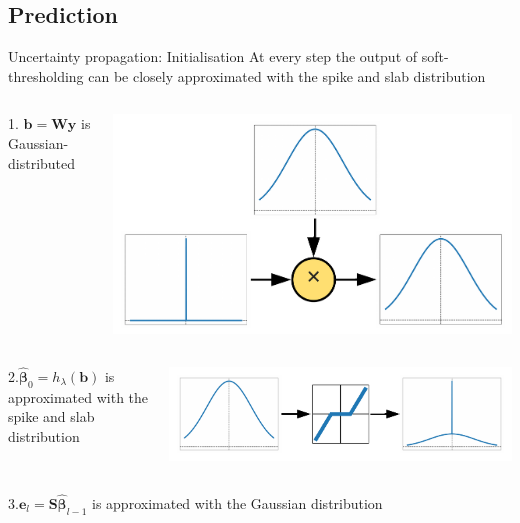 \documentclass[9pt]{beamer}
\begin{document}
\subsection[Prediction]{Prediction}
  \begin{frame}{Uncertainty propagation: Initialisation}
      At every step the output of soft-thresholding can be closely approximated with the spike and slab distribution
      \begin{columns}
        \begin{column}{0.33\textwidth}
      1. \(\mathbf{b} = \mathbf{W}\mathbf{y}\) is Gaussian-distributed
    \end{column}
    \begin{column}{0.67\textwidth}
        \includegraphics[width=0.6\columnwidth]{graphics/gauss_delta.pdf}
      \end{column}
    \end{columns}
    \begin{columns}
      \begin{column}{0.33\textwidth}
      2.\(\widehat{\boldsymbol\beta}_{0} = h_\lambda(\mathbf{b})\) is approximated with the spike and slab distribution
    \end{column}
    \begin{column}{0.67\textwidth}
        \includegraphics[width=0.6\columnwidth]{graphics/spsl_propagation.pdf}
      \end{column}
    \end{columns}
    \begin{columns}
      \begin{column}{0.33\textwidth}
      3.\(\mathbf{e}_l = \mathbf{S}\widehat{\boldsymbol\beta}_{l-1}\) is approximated with the Gaussian distribution
    \end{column}

\end{columns}
\end{frame}
\end{document}
